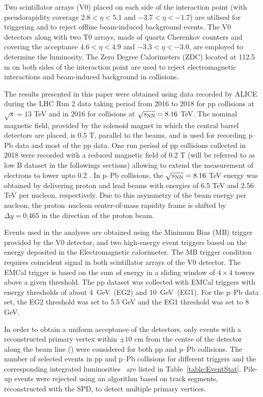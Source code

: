 Two scintillator arrays (V0) placed on each side of the interaction point (with pseudorapidity coverage $2.8 < \eta < 5.1$ and $-3.7 < \eta < -1.7$) are utilised for triggering and to reject offline beam-induced background events. The V0 detectors along with two T0 arrays, made of quartz Cherenkov counters and covering the acceptance $4.6 < \eta < 4.9$ and $-3.3 < \eta < -3.0$, are  employed to determine the luminosity. The Zero Degree Calorimeters (ZDC) located at 112.5 m on both sides of the interaction point are used to reject electromagnetic interactions and beam-induced background in \pPb collisions.

The results presented in this paper were obtained using data recorded by ALICE during the LHC Run 2 data taking period from 2016 to 2018 for pp collisions at $\sqrt{s}=13$ TeV and in 2016 for \pPb collisions at $\sqrt{s_{\rm{NN}}}=8.16$ TeV. The nominal magnetic field, provided by the solenoid magnet in which the central barrel detectors are placed, is 0.5 T, parallel to the beams, and is used for recording p--Pb data and most of the pp data. One run period of pp collisions collected in 2018 were recorded with a reduced magnetic field of 0.2 T (will be referred to as low B dataset in the followings sections) allowing to extend the measurement of electrons to lower \pt upto 0.2 \GeVc.
In p--Pb collisions, the $\sqrt{s_{\rm{NN}}}=8.16$ TeV energy was obtained by delivering proton and lead beams with energies of 6.5 TeV and 2.56 TeV per nucleon, respectively. Due to this asymmetry of the beam energy per nucleon, the proton–nucleon center-of-mass rapidity frame is shifted by $\Delta y = 0.465$ in the direction of the proton beam. 

Events used in the analyses are obtained using the Minimum Bias (MB) trigger provided by the V0 detector, and two high-energy event triggers based on the energy deposited in the Electromagnetic calorimeter. The MB trigger condition requires coincident signal in both scintillator arrays of the V0 detector. The EMCal trigger is based on the sum of energy in a sliding window of $4\times4$ towers above a given threshold. The pp dataset was collected with EMCal triggers with energy thresholds of about 4~GeV~(EG2) and 10~GeV~(EG1). For the p--Pb data set, the EG2 threshold was set to 5.5 GeV and the EG1 threshold was set to 8 GeV. 

In order to obtain a uniform acceptance of the detectors, only events with a reconstructed primary vertex within $\pm10$ cm from the centre of the detector along the beam line (\zvertex) were considered for both pp and p--Pb collisions. The number of selected events in pp and p--Pb collisions for different triggers and the corresponding integrated luminosities~\cite{ALICE-PUBLIC-2016-002} are listed in Table~\ref{table:EventStat}. Pile-up events %
were rejected using an algorithm based on track segments, reconstructed with the SPD, to detect multiple primary vertices. %

